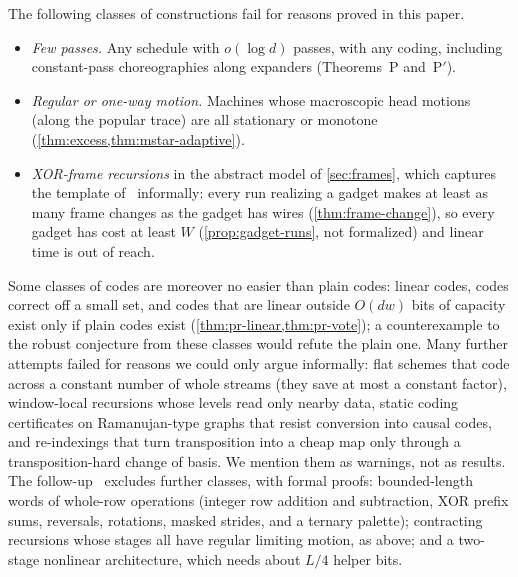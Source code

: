 The following classes of constructions fail for reasons proved in this paper.
\begin{itemize}[leftmargin=2em]
\item \emph{Few passes.} Any schedule with $o(\log d)$ passes, with any coding, including constant-pass
choreographies along expanders (Theorems~P and~P$'$).
\item \emph{Regular or one-way motion.} Machines whose macroscopic head motions (along the popular trace) are all
stationary or monotone (\cref{thm:excess,thm:mstar-adaptive}).
\item \emph{XOR-frame recursions} in the abstract model of \cref{sec:frames}, which captures the template
of~\cite{OpenAI2026mult} informally: every run realizing a gadget makes at least as many frame changes as the gadget has wires (\cref{thm:frame-change}), so every gadget has cost at least $W$ (\cref{prop:gadget-runs}, not formalized) and linear time is out of reach.
\end{itemize}
Some classes of codes are moreover no easier than plain codes: linear codes, codes correct off a small set, and codes
that are linear outside $O(dw)$ bits of capacity exist only if plain codes exist (\cref{thm:pr-linear,thm:pr-vote});
a counterexample to the robust conjecture from these classes would refute the plain one.
Many further attempts failed for reasons we could only argue informally: flat schemes that code across a constant
number of whole streams (they save at most a constant factor), window-local recursions whose levels read only
nearby data, static coding certificates on Ramanujan-type graphs that resist conversion into causal codes, and
re-indexings that turn transposition into a cheap map only through a transposition-hard change of basis. We mention them as warnings, not as results. The follow-up~\cite{BrendeAstra2026} excludes further classes, with formal proofs: bounded-length words of whole-row operations (integer row addition and subtraction, XOR prefix sums, reversals, rotations, masked strides, and a ternary palette); contracting recursions whose stages all have regular limiting motion, as above; and a two-stage nonlinear architecture, which needs about $L/4$ helper bits.
